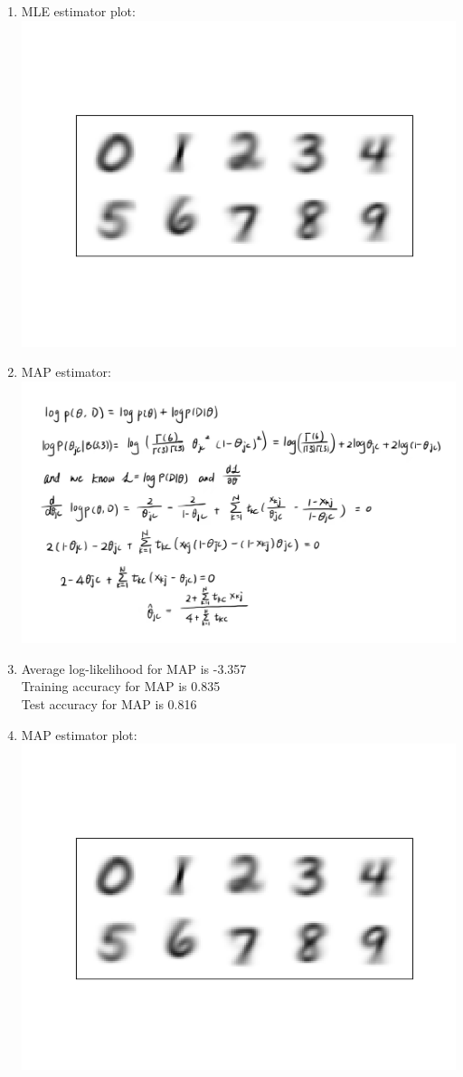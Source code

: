 \documentclass[12pt]{article}
\begin{document}
\begin{enumerate}[label=\alph*)]
		\item MLE estimator plot: \\\includegraphics[scale=0.5]{mle.png}
		\item MAP estimator:\\\includegraphics[scale=0.2]{2e}
		\item Average log-likelihood for MAP is -3.357\\
		Training accuracy for MAP is 0.835\\
		Test accuracy for MAP is 0.816\\
		\item MAP estimator plot: \\\includegraphics[scale=0.5]{map.png}

\end{enumerate}
\end{document}
